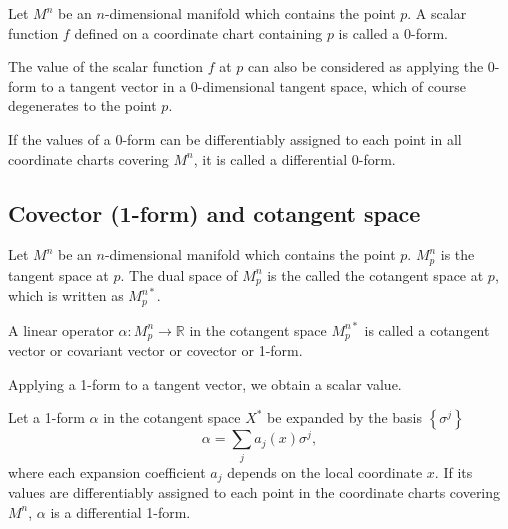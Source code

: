 \documentclass[11pt, a4paper]{book}
\begin{document}
\begin{Definition}[0-form]
  \label{def:0-form}
  Let $M^n$ be an $n$-dimensional manifold which contains the point $p$. A scalar function
  $f$ defined on a coordinate chart containing $p$ is called a 0-form.
\end{Definition}

\begin{mycomment}
  The value of the scalar function $f$ at $p$ can also be considered as applying the
  0-form to a tangent vector in a 0-dimensional tangent space, which of course degenerates
  to the point $p$.
\end{mycomment}

\begin{Definition}
  If the values of a 0-form can be differentiably assigned to each point in all coordinate
  charts covering $M^n$, it is called a differential 0-form.
\end{Definition}

\subsection{Covector (1-form) and cotangent space}
\label{sec:1-form}

\begin{Definition}
  Let $M^n$ be an $n$-dimensional manifold which contains the point $p$. $M_p^n$ is the
  tangent space at $p$. The dual space of $M_p^n$ is the called the cotangent space at
  $p$, which is written as $M_p^{n*}$.
\end{Definition}

\begin{Definition}
  A linear operator $\alpha: M_p^n \rightarrow \mathbb{R}$ in the cotangent space
  $M_p^{n*}$ is called a cotangent vector or covariant vector or covector or 1-form.
\end{Definition}
Applying a 1-form to a tangent vector, we obtain a scalar value.

\begin{Definition}
  Let a 1-form $\alpha$ in the cotangent space $X^{*}$ be expanded by the basis $\left\{
    \sigma^j \right\}$
  \begin{equation*}
    \alpha = \sum_j a_j(x) \sigma^j,
  \end{equation*}
  where each expansion coefficient $a_j$ depends on the local coordinate $x$. If its
  values are differentiably assigned to each point in the coordinate charts covering
  $M^n$, $\alpha$ is a differential 1-form.
\end{Definition}
\end{document}
